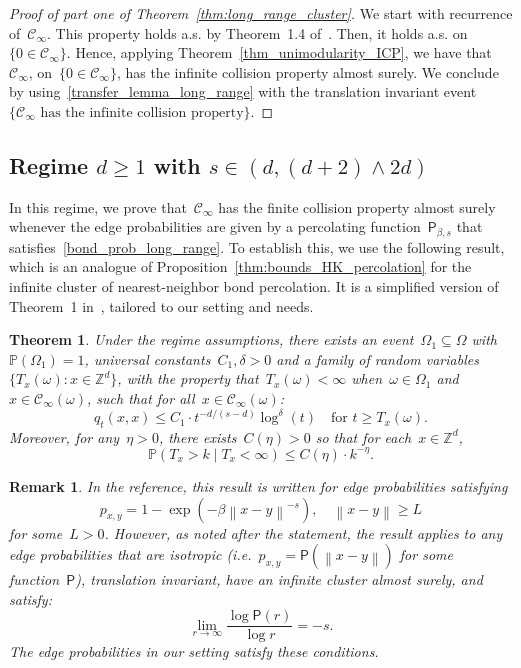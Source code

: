 \documentclass[a4paper,11pt]{article}
\newcommand{\PP}{\mathbb{P}}
\newcommand{\ZZ}{\mathbb{Z}}
\newcommand\norm[1]{\left\lVert#1\right\rVert}
\newtheorem{theorem}{Theorem}
\newtheorem{remark}{Remark}
\theoremstyle{definition}
\begin{document}
\begin{proof}[Proof of part one of Theorem~\ref{thm:long_range_cluster}] We start with recurrence of~$\mathcal C_\infty$. This property holds a.s. by Theorem~1.4 of~\cite{Berger02}. Then, it holds a.s. on~$\{0 \in \mathcal C_\infty\}$. Hence, applying Theorem~\ref{thm_unimodularity_ICP}, we have that~$\mathcal C_\infty$, on~$\{0 \in \mathcal C_\infty\}$, has the infinite collision property almost surely. We conclude by using~\eqref{transfer_lemma_long_range} with the translation invariant event~$\{\mathcal C_\infty \text{ has the infinite collision property}\}$. 
\end{proof}

\subsection{Regime $d \ge 1$ with $s \in (d,(d+2)\wedge 2d )$}\label{ss_reg_long_tran}
In this regime, we prove that~$\mathcal C_\infty$ has the finite collision property almost surely whenever the edge probabilities are given by a percolating function~$\mathsf P_{\beta,s}$ that satisfies~\eqref{bond_prob_long_range}. To establish this, we use the following result, which is an analogue of Proposition~\ref{thm:bounds_HK_percolation} for the infinite cluster of nearest-neighbor bond percolation. It is a simplified version of Theorem~1 in~\cite{Sly12}, tailored to our setting and needs.
\begin{theorem}\label{thm:heat_kernel_sly}
Under the regime assumptions, there exists an event~$\Omega_1 \subseteq \Omega$ with~$\PP(\Omega_1) = 1$, universal constants~$C_1,\delta > 0$ and a family of random variables~$\{T_x(\omega):x \in \ZZ^d\}$, with the property that~$T_x(\omega) < \infty$ when~$\omega \in \Omega_1$ and~$x \in \mathcal C_\infty(\omega)$, such that for all~$x \in \mathcal C_\infty(\omega)$:
$$ q_t(x,x) \leq C_1 \cdot t^{-d/(s-d)} \log^\delta(t) \quad \text{for } t \ge T_x(\omega). $$
Moreover, for any~$\eta > 0$, there exists~$C(\eta) > 0$ so that for each~$x \in \ZZ^d$, 
$$ \PP( T_x > k \mid  T_x < \infty) \leq C(\eta) \cdot k^{-\eta}. $$
\end{theorem}
\begin{remark}
In the reference, this result is written for edge probabilities satisfying 
$$  p_{x,y} = 1 - \exp(-\beta \norm{x-y}^{-s} ), \quad \norm{x-y} \ge L $$
for some~$L>0$. However, as noted after the statement, the result applies to any edge probabilities that are isotropic (i.e.~$p_{x,y}=\mathsf P(\norm{x-y})$ for some function~$\mathsf P$), translation invariant, have an infinite cluster almost surely, and satisfy:
$$ \lim_{r \to \infty} \frac{ \log \mathsf P(r) }{\log r} = -s. $$
The edge probabilities in our setting satisfy these conditions.
\end{remark}
\end{document}
